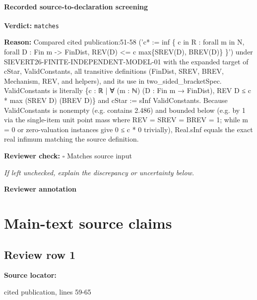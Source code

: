 \documentclass[10pt]{article}
\newcommand{\reviewerbox}{%
  \par\noindent\fbox{\parbox{0.96\linewidth}{\rule{0pt}{0.38in}}}\par
}
\newcommand{\reviewmatch}[1]{%
  \par\noindent\textbf{Reviewer check:} $\square$\; #1\par
  \noindent\emph{If left unchecked, explain the discrepancy or uncertainty below.}\par
}
\begin{document}
\paragraph{Recorded source-to-declaration screening}
\textbf{Verdict:} \texttt{matches}
\\
{\raggedright
\textbf{Reason:} Compared cited publication:\allowbreak{}51-\allowbreak{}58 ('c* :\allowbreak{}= inf \{ c in R :\allowbreak{} forall m in N, forall D :\allowbreak{} Fin m -\allowbreak{}> FinDist, REV(D) <= c max\{SREV(D), BREV(D)\} \}') under SIEVERT26-\allowbreak{}FINITE-\allowbreak{}INDEPENDENT-\allowbreak{}MODEL-\allowbreak{}01 with the expanded target of cStar, ValidConstants, all transitive definitions (FinDist, SREV, BREV, Mechanism, REV, and helpers), and its use in two\_\allowbreak{}sided\_\allowbreak{}bracketSpec.\allowbreak{} ValidConstants is literally \{c :\allowbreak{} ℝ | ∀ (m :\allowbreak{} ℕ) (D :\allowbreak{} Fin m → FinDist), REV D ≤ c * max (SREV D) (BREV D)\} and cStar :\allowbreak{}= sInf ValidConstants.\allowbreak{} Because ValidConstants is nonempty (e.\allowbreak{}g.\allowbreak{} contains 2.\allowbreak{}486) and bounded below (e.\allowbreak{}g.\allowbreak{} by 1 via the single-\allowbreak{}item unit point mass where REV = SREV = BREV = 1;\allowbreak{} while m = 0 or zero-\allowbreak{}valuation instances give 0 ≤ c * 0 trivially), Real.\allowbreak{}sInf equals the exact real infimum matching the source definition.\allowbreak{}
\par}
\reviewmatch{Matches source input}
\noindent\textbf{Reviewer annotation}\par
\reviewerbox

\clearpage
\hypertarget{source-claim-c62d7224d99f5065}{}
\hypertarget{source-section-0c7af8265958a9ea}{}
\section*{Main-text source claims}
\subsection*{Review row 1}
\textbf{Source locator:} {\footnotesize\raggedright cited publication, lines 59-\allowbreak{}65\par}
\end{document}
